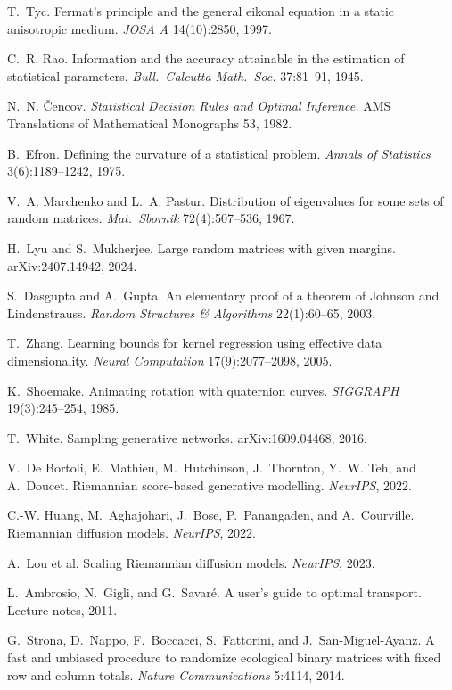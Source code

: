 \documentclass[11pt,a4paper]{article}
\theoremstyle{plain}
\theoremstyle{remark}
\begin{document}
\medskip\noindent T.~Tyc. Fermat's principle and the general eikonal equation in a static anisotropic medium. \emph{JOSA A} 14(10):2850, 1997.

\medskip\noindent C.~R. Rao. Information and the accuracy attainable in the estimation of statistical parameters. \emph{Bull.\ Calcutta Math.\ Soc.} 37:81--91, 1945.

\medskip\noindent N.~N. \v{C}encov. \emph{Statistical Decision Rules and Optimal Inference.} AMS Translations of Mathematical Monographs 53, 1982.

\medskip\noindent B.~Efron. Defining the curvature of a statistical problem. \emph{Annals of Statistics} 3(6):1189--1242, 1975.

\medskip\noindent V.~A. Marchenko and L.~A. Pastur. Distribution of eigenvalues for some sets of random matrices. \emph{Mat.\ Sbornik} 72(4):507--536, 1967.

\medskip\noindent H.~Lyu and S.~Mukherjee. Large random matrices with given margins. arXiv:2407.14942, 2024.

\medskip\noindent S.~Dasgupta and A.~Gupta. An elementary proof of a theorem of Johnson and Lindenstrauss. \emph{Random Structures \& Algorithms} 22(1):60--65, 2003.

\medskip\noindent T.~Zhang. Learning bounds for kernel regression using effective data dimensionality. \emph{Neural Computation} 17(9):2077--2098, 2005.

\medskip\noindent K.~Shoemake. Animating rotation with quaternion curves. \emph{SIGGRAPH} 19(3):245--254, 1985.

\medskip\noindent T.~White. Sampling generative networks. arXiv:1609.04468, 2016.

\medskip\noindent V.~De Bortoli, E.~Mathieu, M.~Hutchinson, J.~Thornton, Y.~W. Teh, and A.~Doucet. Riemannian score-based generative modelling. \emph{NeurIPS}, 2022.

\medskip\noindent C.-W. Huang, M.~Aghajohari, J.~Bose, P.~Panangaden, and A.~Courville. Riemannian diffusion models. \emph{NeurIPS}, 2022.

\medskip\noindent A.~Lou et al. Scaling Riemannian diffusion models. \emph{NeurIPS}, 2023.

\medskip\noindent L.~Ambrosio, N.~Gigli, and G.~Savar\'e. A user's guide to optimal transport. Lecture notes, 2011.

\medskip\noindent G.~Strona, D.~Nappo, F.~Boccacci, S.~Fattorini, and J.~San-Miguel-Ayanz. A fast and unbiased procedure to randomize ecological binary matrices with fixed row and column totals. \emph{Nature Communications} 5:4114, 2014.
\end{document}
